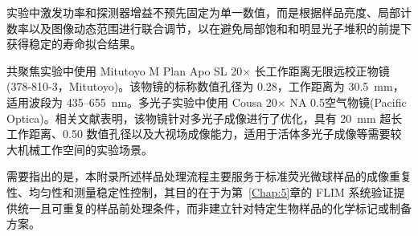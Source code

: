 实验中激发功率和探测器增益不预先固定为单一数值，而是根据样品亮度、局部计数率以及图像动态范围进行联合调节，以在避免局部饱和和明显光子堆积的前提下获得稳定的寿命拟合结果。

共聚焦实验中使用 Mitutoyo M Plan Apo SL 20$\times$ 长工作距离无限远校正物镜(378-810-3，Mitutoyo)。该物镜的标称数值孔径为 0.28，工作距离为 30.5~mm，适用波段为 435--655~nm\cite{Mitutoyo20xSpec}。多光子实验中使用 Cousa 20$\times$ NA 0.5空气物镜(Pacific Optica)。相关文献表明，该物镜针对多光子成像进行了优化，具有 20~mm 超长工作距离、0.50 数值孔径以及大视场成像能力，适用于活体多光子成像等需要较大机械工作空间的实验场景\cite{RN1262}。

需要指出的是，本附录所述样品处理流程主要服务于标准荧光微球样品的成像重复性、均匀性和测量稳定性控制，其目的在于为第~\ref{Chap:5}章的 FLIM 系统验证提供统一且可重复的样品前处理条件，而非建立针对特定生物样品的化学标记或制备方案。
